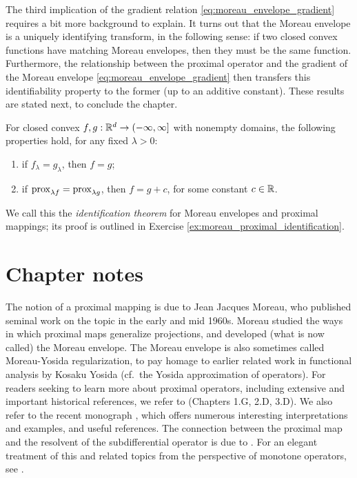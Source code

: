 The third implication of the gradient relation
\eqref{eq:moreau_envelope_gradient} requires a bit more background to
explain. It turns out that the Moreau envelope is a uniquely identifying
transform, in the following sense: if two closed convex functions have matching
Moreau envelopes, then they must be the same function. Furthermore, the
relationship between the proximal operator and the gradient of the Moreau
envelope \eqref{eq:moreau_envelope_gradient} then transfers this identifiability
property to the former (up to an additive constant). These results are stated
next, to conclude the chapter.      

\begin{Theorem}
\label{thm:moreau_proximal_identification}
For closed convex $f,g : \mathbb{R}^d \to (-\infty, \infty]$ with nonempty domains, the
following properties hold, for any fixed $\lambda > 0$: 
\begin{enumerate}[label=(\roman*)]
\item if $f_\lambda = g_\lambda$, then $f = g$; 
\item if $\operatorname{prox}_{\lambda f} = \operatorname{prox}_{\lambda g}$, then $f = g + c$, for some
  constant $c \in \mathbb{R}$.  
\end{enumerate} 
\end{Theorem}


We call this the \emph{identification theorem} for Moreau envelopes and proximal
mappings; its proof is outlined in Exercise
\ref{ex:moreau_proximal_identification}.  

\SkipTocEntry\section*{Chapter notes}

The notion of a proximal mapping is due to Jean Jacques Moreau, who published
seminal work on the topic in the early and mid 1960s. Moreau studied the ways in
which proximal maps generalize projections, and developed (what is now called)
the Moreau envelope. The Moreau envelope is also sometimes called Moreau-Yosida
regularization, to pay homage to earlier related work in functional analysis by
Kosaku Yosida (cf.\ the Yosida approximation of operators). For readers seeking
to learn more about proximal operators, including extensive and important
historical references, we refer to \cite{rockafellar2009variational} (Chapters
1.G, 2.D, 3.D). We also refer to the recent monograph \cite{parikh2013proximal},
which offers numerous interesting interpretations and examples, and useful 
references. The connection between the proximal map and the resolvent of the
subdifferential operator is due to \cite{rockafellar1976monotone}. For an
elegant treatment of this and related topics from the perspective of monotone
operators, see \cite{bauschke2011convex}.

